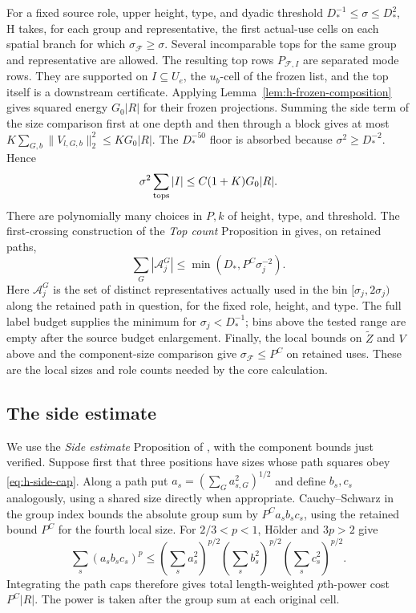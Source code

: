 For a fixed source role, upper height, type, and dyadic threshold
\(D_*^{-1}\le\sigma\le D_*^2\), H takes, for each group and
representative, the first actual-use cells on each spatial branch
for which \(\sigma_{\mathcal F}\ge\sigma\).  Several incomparable
tops for the same group and representative are allowed.  The
resulting top rows
\(P_{\mathcal F,I}\) are separated mode rows.  They are supported
on \(I\subseteq U_e\), the \(u_b\)-cell of the frozen list, and
the top itself is a downstream certificate.  Applying
Lemma~\ref{lem:h-frozen-composition} gives squared energy
\(G_0|R|\) for their frozen projections.  Summing the side
term of the size comparison first at one depth and then through
a block gives at most
\(K\sum_{G,b}\|V_{l,G,b}\|_2^2\le KG_0|R|\).  The
\(D_*^{-50}\) floor is absorbed because
\(\sigma^2\ge D_*^{-2}\).  Hence
\[
 \sigma^2\sum_{\rm tops}|I|\le C(1+K)G_0|R|.
\]
There are polynomially many choices in \(P,k\) of height, type,
and threshold.  The first-crossing construction of the
\emph{Top count} Proposition in \cite[Section~8]{H} gives, on
retained paths,
\begin{equation}
 \sum_G|\mathcal A_j^G|
       \le\min(D_*,P^C\sigma_j^{-2}).
 \label{eq:h-top-count}
\end{equation}
Here \(\mathcal A_j^G\) is the set of distinct representatives
actually used in the bin \([\sigma_j,2\sigma_j)\) along the retained
path in question, for the fixed role, height, and type.  The full
label budget supplies the
minimum for \(\sigma_j<D_*^{-1}\); bins above the tested range
are empty after the source budget enlargement.  Finally, the
local bounds on \(\widetilde Z\) and \(V\) above and the
component-size comparison give \(\sigma_{\mathcal F}\le P^C\)
on retained uses.  These are the local sizes and role counts
needed by the core calculation.

\subsection{The side estimate}

We use the \emph{Side estimate} Proposition of \cite[Section~7]{H}, with the
component bounds just verified.  Suppose first that three
positions have sizes whose path squares obey
\eqref{eq:h-side-cap}.  Along a path put \(a_s=(\sum_Ga_{s,G}^2)^{1/2}\)
and define \(b_s,c_s\) analogously, using a shared size directly
when appropriate.  Cauchy--Schwarz in the group index
bounds the absolute group sum by \(P^C a_sb_sc_s\), using the
retained bound \(P^C\) for the fourth local size.  For
\(2/3<p<1\), Hölder and \(3p>2\) give
\[
 \sum_s(a_sb_sc_s)^p
 \le
 \left(\sum_sa_s^2\right)^{p/2}
 \left(\sum_sb_s^2\right)^{p/2}
 \left(\sum_sc_s^2\right)^{p/2}.
\]
Integrating the path caps therefore gives total length-weighted
\(p\)th-power cost \(P^C|R|\).  The power is taken after the
group sum at each original cell.


